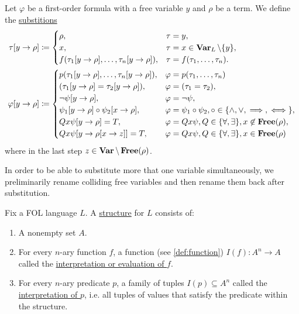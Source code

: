 \begin{definition}\label{def:first_order_substition}
  Let $\varphi$ be a first-order formula with a free variable $y$ and $\rho$ be a term. We define the \uline{substitions}
  \begin{align*}
    \tau[y \to \rho] &\coloneqq \begin{cases}
      \rho,                                              &\tau = y, \\
      x,                                                 &\tau = x \in \operatorname{\mathbf{Var}}_L \setminus \{ y \}, \\
      f(\tau_1[y \to \rho], \ldots, \tau_n[y \to \rho]), &\tau = f(\tau_1, \ldots, \tau_n).
    \end{cases}
    \\
    \varphi[y \to \rho] &\coloneqq \begin{cases}
      p(\tau_1[y \to \rho], \ldots, \tau_n[y \to \rho]), &\varphi = p(\tau_1, \ldots, \tau_n) \\
      (\tau_1[y \to \rho] = \tau_2[y \to \rho]),         &\varphi = (\tau_1 = \tau_2), \\
      \neg \psi[y \to \rho],                             &\varphi = \neg \psi, \\
      \psi_1[y \to \rho] \circ \psi_2[x \to \rho],       &\varphi = \psi_1 \circ \psi_2, \circ \in \{ \land, \lor, \implies, \iff \}, \\
      Q x \psi[y \to \rho] = T,                          &\varphi = Q x \psi, Q \in \{ \forall, \exists \}, x \not\in \operatorname{\mathbf{Free}}(\rho), \\
      Q x \psi[y \to \rho[x \to z]] = T,                 &\varphi = Q x \psi, Q \in \{ \forall, \exists \}, x \in \operatorname{\mathbf{Free}}(\rho)
    \end{cases}
  \end{align*}
  where in the last step $z \in \operatorname{\mathbf{Var}} \setminus \operatorname{\mathbf{Free}}(\rho)$.

  In order to be able to substitute more that one variable simultaneously, we preliminarily rename colliding free variables and then rename them back after substitution.
\end{definition}

\begin{definition}\label{def:first_order_structure}\cite[25]{Lectures:logic_programming}
  Fix a FOL language $L$. A \uline{structure} for $L$ consists of:
  \begin{enumerate}
    \item A nonempty set $A$.
    \item For every $n$-ary function $f$, a function (see \cref{def:function}) $I(f): A^n \to A$ called the \uline{interpretation or evaluation of $f$}.
    \item For every $n$-ary predicate $p$, a family of tuples $I(p) \subseteq A^n$ called the \uline{interpretation of $p$}, i.e. all tuples of values that satisfy the predicate within the structure.
  \end{enumerate}
\end{definition}

